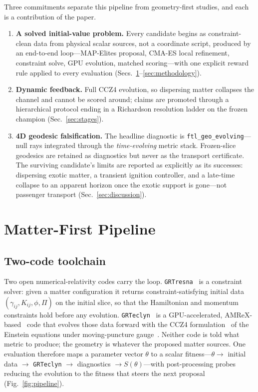 \documentclass[twocolumn,floatfix,aps,prd,nofootinbib]{revtex4-2}
\begin{document}
Three commitments separate this pipeline from geometry-first studies, and each
is a contribution of the paper.
\begin{enumerate}
    \item \textbf{A solved initial-value problem.} Every candidate begins as
    constraint-clean data from physical scalar sources, not a coordinate
    script, produced by an end-to-end loop---MAP-Elites proposal, CMA-ES local
    refinement, constraint solve, GPU evolution, matched scoring---with one
    explicit reward rule applied to every evaluation
    (Secs.~\ref{sec:pipeline}--\ref{sec:methodology}).
    \item \textbf{Dynamic feedback.} Full CCZ4 evolution, so dispersing matter
    collapses the channel and cannot be scored around; claims are promoted
    through a hierarchical protocol ending in a Richardson resolution ladder
    on the frozen champion (Sec.~\ref{sec:stages}).
    \item \textbf{4D geodesic falsification.} The headline diagnostic is
    \texttt{ftl\_geo\_evolving}---null rays integrated through the
    \emph{time-evolving} metric stack. Frozen-slice geodesics are retained as
    diagnostics but never as the transport certificate. The surviving
    candidate's limits are reported as explicitly as its successes: dispersing
    exotic matter, a transient ignition controller, and a late-time collapse to
    an apparent horizon once the exotic support is gone---not passenger
    transport (Sec.~\ref{sec:discussion}).
\end{enumerate}

\section{Matter-First Pipeline}
\label{sec:pipeline}

\subsection{Two-code toolchain}
\label{sec:tools}

Two open numerical-relativity codes carry the loop.
\texttt{GRTresna}~\cite{grtresna} is a constraint solver: given a matter
configuration it returns constraint-satisfying initial data
$(\gamma_{ij},K_{ij},\phi,\Pi)$ on the initial slice, so that the Hamiltonian
and momentum constraints hold before any evolution.
\texttt{GRTeclyn}~\cite{grteclyn,grchombo} is a GPU-accelerated,
AMReX-based~\cite{amrex} code that evolves those data forward with the CCZ4
formulation~\cite{alic12} of the Einstein equations under moving-puncture
gauge~\cite{campanelli06,baker06}. Neither code is told what metric to
produce; the geometry is whatever the proposed matter sources. One evaluation
therefore maps a parameter vector $\theta$ to a scalar fitness---$\theta
\rightarrow$ initial data $\rightarrow$ \texttt{GRTeclyn} $\rightarrow$
diagnostics $\rightarrow S(\theta)$---with post-processing probes reducing the
evolution to the fitness that steers the next proposal
(Fig.~\ref{fig:pipeline}).
\end{document}
